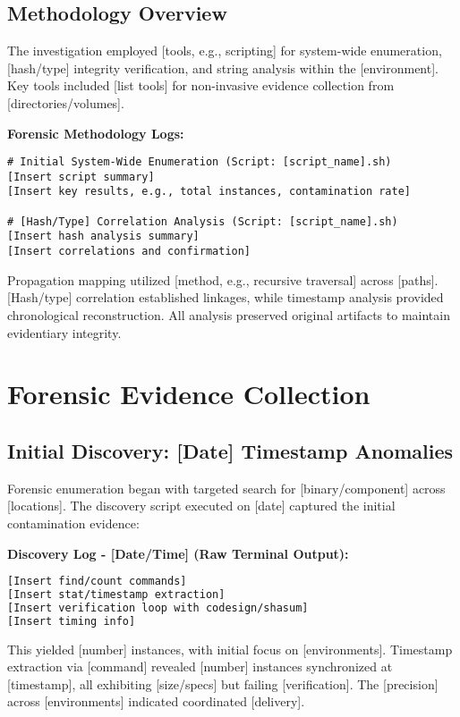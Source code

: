 \documentclass[12pt,a4paper]{article}
\begin{document}
\subsection{Methodology Overview}
The investigation employed [tools, e.g., scripting] for system-wide enumeration, [hash/type] integrity verification, and string analysis within the [environment]. Key tools included [list tools] for non-invasive evidence collection from [directories/volumes].

\textbf{Forensic Methodology Logs:}
\begin{lstlisting}[style=bash, caption={[Component] System-wide Enumeration Script Output}]
# Initial System-Wide Enumeration (Script: [script_name].sh)
[Insert script summary]
[Insert key results, e.g., total instances, contamination rate]

# [Hash/Type] Correlation Analysis (Script: [script_name].sh)  
[Insert hash analysis summary]
[Insert correlations and confirmation]
\end{lstlisting}

Propagation mapping utilized [method, e.g., recursive traversal] across [paths]. [Hash/type] correlation established linkages, while timestamp analysis provided chronological reconstruction. All analysis preserved original artifacts to maintain evidentiary integrity.

\newpage

\section{Forensic Evidence Collection}

\subsection{Initial Discovery: [Date] Timestamp Anomalies}
Forensic enumeration began with targeted search for [binary/component] across [locations]. The discovery script executed on [date] captured the initial contamination evidence:

\textbf{Discovery Log - [Date/Time] (Raw Terminal Output):}
\begin{lstlisting}[style=terminal, caption={Timestamp Synchronization Discovery}, language=bash]
[Insert find/count commands]
[Insert stat/timestamp extraction]
[Insert verification loop with codesign/shasum]
[Insert timing info]
\end{lstlisting}

This yielded [number] instances, with initial focus on [environments]. Timestamp extraction via [command] revealed [number] instances synchronized at [timestamp], all exhibiting [size/specs] but failing [verification]. The [precision] across [environments] indicated coordinated [delivery].
\end{document}
